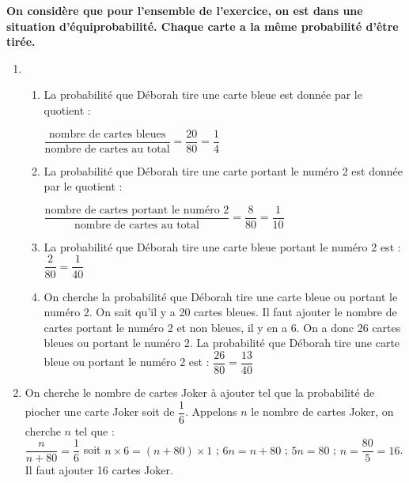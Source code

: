 \textbf{On considère que pour l'ensemble de l'exercice, on est dans une situation d'équiprobabilité. Chaque carte a la même probabilité d'être tirée.}

\begin{enumerate}
    \item 
    \begin{enumerate}
        \item La probabilité que Déborah tire une carte bleue est donnée par le quotient :
        
        \medskip
        $\dfrac{\text{nombre de cartes bleues}}{\text{nombre de cartes au total}}=\dfrac{20}{80}=\dfrac{1}{4}$
        \item La probabilité que Déborah tire une carte portant le numéro 2 est donnée par le quotient :
        
        \medskip
        $\dfrac{\text{nombre de cartes portant le numéro 2}}{\text{nombre de cartes au total}}=\dfrac{8}{80}=\dfrac{1}{10}$
        \item La probabilité que Déborah tire une carte bleue portant le numéro 2 est : $\dfrac{2}{80}=\dfrac{1}{40}$
        \item On cherche la probabilité que Déborah tire une carte bleue ou portant le numéro 2. On sait qu'il y a 20 cartes bleues. Il faut ajouter le nombre de cartes portant le numéro 2 et non bleues, il y en a 6. On a donc 26 cartes bleues ou portant le numéro 2. La probabilité que Déborah tire une carte bleue ou portant le numéro 2 est : $\dfrac{26}{80}=\dfrac{13}{40}$
    \end{enumerate}
    \item On cherche le nombre de cartes Joker à ajouter tel que la probabilité de piocher une carte Joker soit de $\dfrac{1}{6}$. Appelons $n$ le nombre de cartes Joker, on cherche $n$ tel que : \\$\dfrac{n}{n+80}=\dfrac{1}{6}$ soit $n\times6=(n+80)\times1$ ; $6n=n+80$ ; $5n=80$ ; $n=\dfrac{80}{5}=16$.\\Il faut ajouter 16 cartes Joker.
    
\end{enumerate}
